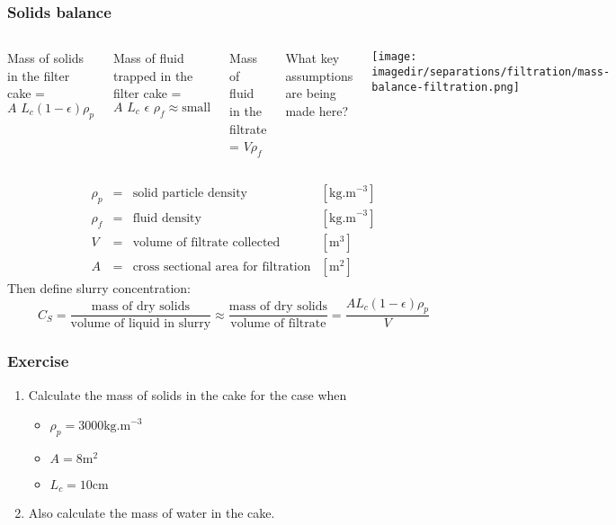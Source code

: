 \begin{frame}\frametitle{Solids balance}
	\begin{columns}[t]
			Mass of solids in the filter cake = {\color{brown}$A \,\,L_c\left(1-\epsilon\right)\rho_p$}

			\vspace{5pt}
			Mass of fluid trapped in the filter cake = {\color{myOrange}$A \,\,L_c\,\, \epsilon \,\,\rho_f \approx \text{small}$}

			\vspace{5pt}
			Mass of fluid in the filtrate = {\color{blue}$V \rho_f$}

			\vspace{5pt}
			{\scriptsize \color{red}What key assumptions are being made here?}

			\vspace{-48pt}
			\begin{center}
				\texttt{[image: \\imagedir/separations/filtration/mass-balance-filtration.png]}
			\end{center}

	\end{columns}
	\vspace{1pt}
	\[
		\begin{array}{rcll}
			\rho_p  &=& \text{solid particle density}				&[\text{kg.m}^{-3}]\\
			\rho_f  &=& \text{fluid density}						&[\text{kg.m}^{-3}]\\
			V		&=& \text{volume of filtrate collected} 		&[\text{m}^3]\\
			A		&=& \text{cross sectional area for filtration}  &[\text{m}^2]
		\end{array}
	\]
	Then define {\color{purple}slurry concentration}: \\
	\[ C_S = \dfrac{\text{mass of dry solids}}{\text{volume of liquid in slurry}}  \approx \dfrac{\text{mass of dry solids}}{\text{volume of filtrate}} = \dfrac{A L_c \left(1-\epsilon\right)\rho_p}{V} \]
\end{frame}

\begin{frame}\frametitle{Exercise}
	\begin{enumerate}
		\item	Calculate the mass of solids in the cake for the case when
		\begin{itemize}
			\item	$\rho_p = 3000 \text{kg.m}^{-3}$
			\item	$A = 8 \text{m}^2$
			\item	$L_c = 10 \text{cm}$
		\end{itemize}

		\item	Also calculate the mass of water in the cake.
	\end{enumerate}
\end{frame}

